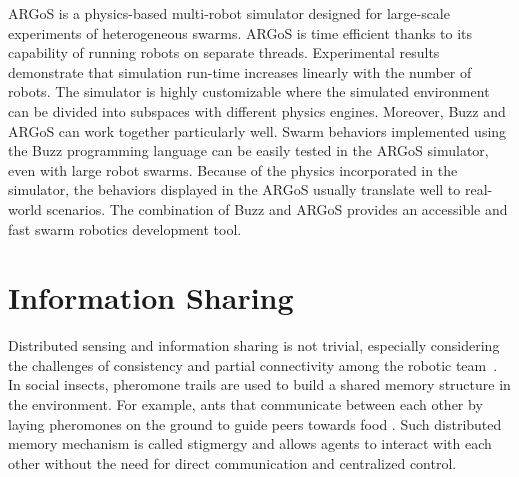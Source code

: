 ARGoS \cite{Pinciroli:SI2012} is a physics-based multi-robot simulator designed for large-scale experiments of heterogeneous swarms. ARGoS is time efficient thanks to its capability of running robots on separate threads. Experimental results demonstrate that simulation run-time increases linearly with the number of robots. The simulator is highly customizable where the simulated environment can be divided into subspaces with different physics engines. Moreover, Buzz and ARGoS can work together particularly well. Swarm behaviors implemented using the Buzz programming language can be easily tested in the ARGoS simulator, even with large robot swarms. Because of the physics incorporated in the simulator, the behaviors displayed in the ARGoS usually translate well to real-world scenarios. The combination of Buzz and ARGoS provides an accessible and fast swarm robotics development tool. 

\section{Information Sharing}
Distributed sensing and information sharing is not trivial, especially considering the challenges of consistency and partial connectivity among the
robotic team~\cite{amigoni2017multirobot,otte2018emergent}. In social insects, pheromone trails are used to build a shared memory structure in the environment. For example, ants that communicate between each other by laying pheromones on the ground to guide peers towards food \cite{bonabeau1999swarm}. Such distributed memory mechanism is called stigmergy \cite{heylighen2016stigmergy1, heylighen2016stigmergy2} and allows agents to interact with each other without the need for direct communication and centralized control. 

